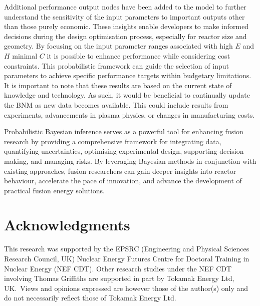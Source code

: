 \documentclass[journal]{IEEEtran}
\begin{document}
Additional performance output nodes have been added to the model to further understand the sensitivity of the input parameters to important outputs other than those purely economic. These insights enable developers to make informed decisions during the design optimisation process, especially for reactor size and geometry. By focusing on the input parameter ranges associated with high $E$ and $H$ minimal $C$ it is possible to enhance performance while considering cost constraints. This probabilistic framework can guide the selection of input parameters to achieve specific performance targets within budgetary limitations. It is important to note that these results are based on the current state of knowledge and technology. As such, it would be beneficial to continually update the BNM as new data becomes available. This could include results from experiments, advancements in plasma physics, or changes in manufacturing costs.

Probabilistic Bayesian inference serves as a powerful tool for enhancing fusion research by providing a comprehensive framework for integrating data, quantifying uncertainties, optimising experimental design, supporting decision-making, and managing risks. By leveraging Bayesian methods in conjunction with existing approaches, fusion researchers can gain deeper insights into reactor behaviour, accelerate the pace of innovation, and advance the development of practical fusion energy solutions.

\section{Acknowledgments}
This research was supported by the EPSRC (Engineering and Physical Sciences Research Council, UK) Nuclear Energy Futures Centre for Doctoral Training in Nuclear Energy (NEF CDT). Other research studies under the NEF CDT involving Thomas Griffiths are supported in part by Tokamak Energy Ltd, UK.\ Views and opinions expressed are however those of the author(s) only and do not necessarily reflect those of Tokamak Energy Ltd.





\begin{appendices}
    
 \end{appendices}
\end{document}
